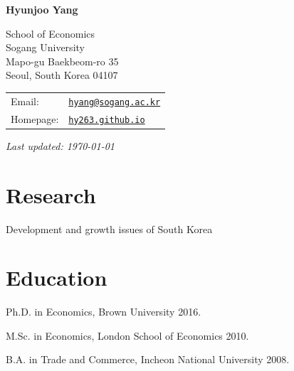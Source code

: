 \documentclass[a4paper,12pt]{article}
\def\name{Hyunjoo Yang}
\renewenvironment{itemize}{
  \begin{list}{}{
    \setlength{\leftmargin}{1.5em}
  }
}{
  \end{list}
}
\begin{document}
\centerline{\huge \bf \name}

\vspace{0.2in}

\begin{minipage}{0.48\linewidth}
School of Economics \\
Sogang University \\
Mapo-gu Baekbeom-ro 35 \\
Seoul, South Korea 04107
\end{minipage}
\begin{minipage}{0.45\linewidth}
  \begin{tabular}{ll}
    Email: & \href{mailto:hyang@sogang.ac.kr}{\tt hyang@sogang.ac.kr} \\
    Homepage: & \href{https://hy263.github.io}{\tt hy263.github.io} \\
  \end{tabular}
\end{minipage}

\vspace{4mm}
\textit{Last updated: \today}

\section*{Research}
\begin{itemize}
	\item Development and growth issues of South Korea
\end{itemize}

\section*{Education}

\begin{itemize}
  \item Ph.D. in Economics, Brown University 2016.
  \item M.Sc. in Economics, London School of Economics 2010.
  \item B.A. in Trade and Commerce, Incheon National University 2008.
\end{itemize}
\end{document}
